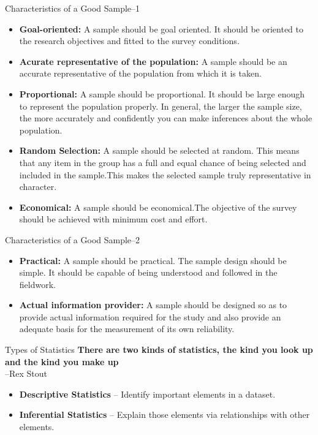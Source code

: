 \documentclass[10pt,dvipsnames, aspectratio=169]{beamer}
\begin{document}
\begin{frame}[t]{Characteristics of a Good Sample--1}
	\begin{itemize}
		\item \textbf{Goal-oriented:} A sample should be goal oriented. It 
		should be oriented to the research objectives and fitted to the survey 
		conditions. \pause 
		\item \textbf{Acurate representative of the population:} A sample 
		should be an accurate representative of the population from which it is 
		taken. \pause
		\item \textbf{Proportional:} A sample should be proportional. It should 
		be large enough to represent the population properly. In general, the 
		larger the sample size, the more accurately and confidently 
		you can make inferences about the whole population.\pause 
		
		\item \textbf{Random Selection:} A sample should be selected at random. 
		This means that any item in the group has a full and equal chance of 
		being selected and included in the sample.This makes the selected 
		sample truly representative in character. \pause 
		\item \textbf{Economical:} A sample should be economical.The objective 
		of the survey should be achieved with minimum cost and effort. 
		
	\end{itemize}
\end{frame}

\begin{frame}[t]{Characteristics of a Good Sample--2}
	\begin{itemize}
		\item \textbf{Practical:} A sample should be practical. The sample 
		design should be simple. It should be capable of being understood and 
		followed in the fieldwork. \pause 
		\item \textbf{Actual information provider:} A sample should be designed 
		so as to provide actual information required for the study and also 
		provide an adequate basis for the measurement of its own reliability. 
		\pause
	\end{itemize}
\end{frame}


\begin{frame}[t]{Types of Statistics}
	\textbf{There are two kinds of statistics,
		the kind you look up and the kind
		you make up} \\ 
	--Rex Stout
	\begin{itemize}
		\item \textbf{Descriptive Statistics} -- Identify important elements in 
		a
		dataset.
		\item \textbf{Inferential Statistics} -- Explain those elements via
		relationships with other elements.
	\end{itemize}
\end{frame} 
\end{document}
